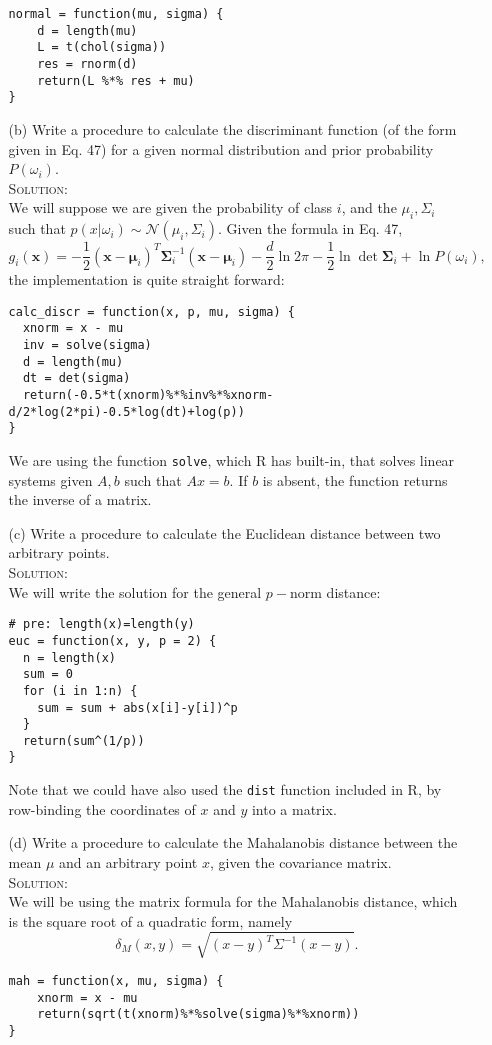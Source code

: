 \documentclass[10pt]{article}
\begin{document}
\begin{enumerate}
\begin{enumerate}
\begin{verbatim}
normal = function(mu, sigma) {
    d = length(mu)
    L = t(chol(sigma))
    res = rnorm(d)
    return(L %*% res + mu)
}
        \end{verbatim}
    \item[(b)] Write a procedure to calculate the discriminant function (of the form given in Eq. 47) for a given normal distribution and prior probability $P(\omega_i)$.\\
        {\scshape Solution:}\\
        We will suppose we are given the probability of class $i$, and the $\mu_i,\Sigma_i$ such that $p(x|\omega_i)\sim\mathcal N(\mu_i,\Sigma_i)$. Given the formula in Eq. 47,
        \[
g_i(\boldsymbol x)=-\frac{1}{2}(\boldsymbol x-\boldsymbol\mu_i)^T\boldsymbol\Sigma_i^{-1}(\boldsymbol x-\boldsymbol\mu_i)-\frac{d}{2}\ln{2\pi}-\frac{1}{2}\ln{\det{\boldsymbol\Sigma_i}}+\ln{P(\omega_i)},
        \]
        the implementation is quite straight forward:
        \begin{verbatim}
calc_discr = function(x, p, mu, sigma) {
  xnorm = x - mu
  inv = solve(sigma)
  d = length(mu)
  dt = det(sigma)
  return(-0.5*t(xnorm)%*%inv%*%xnorm-d/2*log(2*pi)-0.5*log(dt)+log(p))
}
        \end{verbatim}
        We are using the function \verb|solve|, which R has built-in, that solves linear systems given $A,b$ such that $Ax=b$. If $b$ is absent, the function returns the inverse of a matrix.
    \item[(c)] Write a procedure to calculate the Euclidean distance between two arbitrary points.\\
        {\scshape Solution:}\\
        We will write the solution for the general $p-$norm distance:
        \begin{verbatim}
# pre: length(x)=length(y)
euc = function(x, y, p = 2) {
  n = length(x)
  sum = 0
  for (i in 1:n) {
    sum = sum + abs(x[i]-y[i])^p
  }
  return(sum^(1/p))
}
        \end{verbatim}
        Note that we could have also used the \verb|dist| function included in R, by row-binding the coordinates of $x$ and $y$ into a matrix.
    \item[(d)] Write a procedure to calculate the Mahalanobis distance between the mean $\mu$ and an arbitrary point $x$, given the covariance matrix.\\
        {\scshape Solution:}\\
        We will be using the matrix formula for the Mahalanobis distance, which is the square root of a quadratic form, namely
        \[
        \delta_M(x,y)=\sqrt{(x-y)^T\Sigma^{-1}(x-y)}.
        \]
        \begin{verbatim}
mah = function(x, mu, sigma) {
    xnorm = x - mu
    return(sqrt(t(xnorm)%*%solve(sigma)%*%xnorm))
}
        \end{verbatim}
  \end{enumerate}
\end{enumerate}
\end{document}
